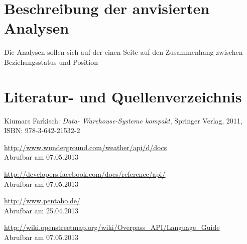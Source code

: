 \documentclass[a4paper,12pt]{scrartcl}
\begin{document}
\section{Beschreibung der anvisierten Analysen}

Die Analysen sollen sich auf der einen Seite auf den Zusammenhang zwischen Beziehungsstatus und Position



\clearpage
\section{Literatur- und Quellenverzeichnis}

\renewcommand\refname{Literaturverzeichnis}
\begin{thebibliography}{999}

Kiumars Farkisch:  {\sl Data- Warehouse-Systeme kompakt}, Springer Verlag, 2011,
\\ISBN:  978-3-642-21532-2

\end{thebibliography}

\renewcommand\refname{Quellenverzeichnis}
\begin{thebibliography}{999}

\url{http://www.wunderground.com/weather/api/d/docs}
\\Abrufbar am 07.05.2013


\url{http://developers.facebook.com/docs/reference/api/}
\\Abrufbar am 07.05.2013


\url{http://www.pentaho.de/}
\\Abrufbar am 25.04.2013


\url{http://wiki.openstreetmap.org/wiki/Overpass_API/Language_Guide}
\\Abrufbar am 07.05.2013


\end{thebibliography}

\clearpage
\end{document}
